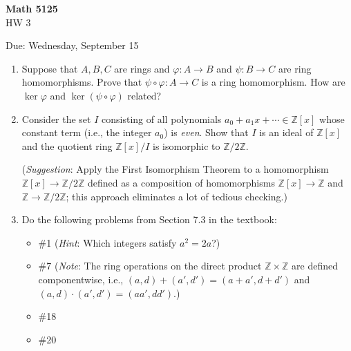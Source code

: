 \documentclass[12pt]{article}
\newcommand{\Z}{\mathbb{Z}}
\begin{document}
\begin{center}
{\bf Math 5125}\\
HW 3
\smallskip

Due: Wednesday, September 15
\end{center}

\begin{enumerate}

\item Suppose that $A,B,C$ are rings and $\varphi : A \to B$ and $\psi: B \to C$ are ring homomorphisms. Prove that $\psi\circ\varphi: A \to C$ is a ring homomorphism. How are $\ker \varphi$ and $\ker(\psi\circ\varphi)$ related?

\item Consider the set $I$ consisting of all polynomials $a_0+a_1x+\dotsm\in\Z[x]$ whose constant term (i.e., the integer $a_0$) is {\em even}. Show that $I$ is an ideal of $\Z[x]$ and the quotient ring $\Z[x]/I$ is isomorphic to $\Z/2\Z$. 

({\em Suggestion}: Apply the First Isomorphism Theorem to a homomorphism $\Z[x]\to\Z/2\Z$ defined as a composition of homomorphisms $\Z[x]\to\Z$ and $\Z\to\Z/2\Z$; this approach eliminates a lot of tedious checking.)

\item Do the following problems from Section 7.3 in the textbook:
\begin{itemize}
\item \#1 ({\em Hint}: Which integers satisfy $a^2=2a$?)
\item \#7 ({\em Note}: The ring operations on the direct product $\Z\times\Z$ are defined componentwise, i.e., $(a,d)+(a',d')=(a+a',d+d')$ and $(a,d)\cdot(a',d')=(aa',dd')$.)
\item \#18
\item \#20
\end{itemize}
\end{enumerate}
\end{document}
